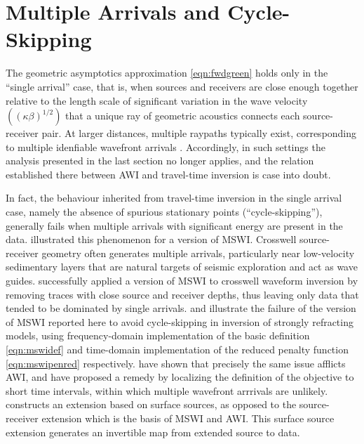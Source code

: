 \section{Multiple Arrivals and Cycle-Skipping}
The geometric asymptotics approximation \ref{eqn:fwdgreen} holds only
in the ``single arrival'' case, that is, when sources and receivers
are close enough together relative to the length scale of significant
variation in the wave velocity $((\kappa\beta)^{1/2})$ that a unique ray of
geometric acoustics connects each source-receiver pair. At larger
distances, multiple raypaths typically exist, corresponding to
multiple idenfiable wavefront arrivals \cite[]{Whi:82}. Accordingly, in such settings
the analysis presented in the last section no longer applies, and the
relation established there between AWI and travel-time inversion is
case into doubt.

In fact, the behaviour inherited from travel-time inversion in the
single arrival case, namely the absence of spurious stationary points
(``cycle-skipping''), generally fails when multiple arrivals with
significant energy are present in the data. \cite{Symes:94c}
illustrated this phenomenon for a version of MSWI. Crosswell
source-receiver geometry often generates multiple arrivals,
particularly near low-velocity sedimentary layers that are natural
targets of seismic exploration and act as wave
guides. \cite{Plessix:00} successfully applied a version of MSWI to
crosswell waveform inversion by removing traces with close source and
receiver depths, thus leaving only data that tended to be dominated by
single arrivals. \cite{HuangSymes:Geo17} and
\cite{SymesChenMinkoff:24} illustrate the failure of the
version of MSWI reported here to avoid cycle-skipping in inversion of
strongly refracting models, using frequency-domain implementation of
the basic definition \ref{eqn:mswidef} and time-domain implementation
of the reduced penalty function \ref{eqn:mswipenred} respectively. \cite{Yongetal:GJI23}
have shown that precisely the same issue afflicts AWI, and have
proposed a remedy by localizing the definition of the objective to
short time intervals, within which multiple wavefront arrrivals are
unlikely. \cite{Symes:23} constructs an extension based on surface
sources, as opposed to the source-receiver extension which is the
basis of MSWI and AWI. This surface source extension generates an
invertible map from extended source to data.


